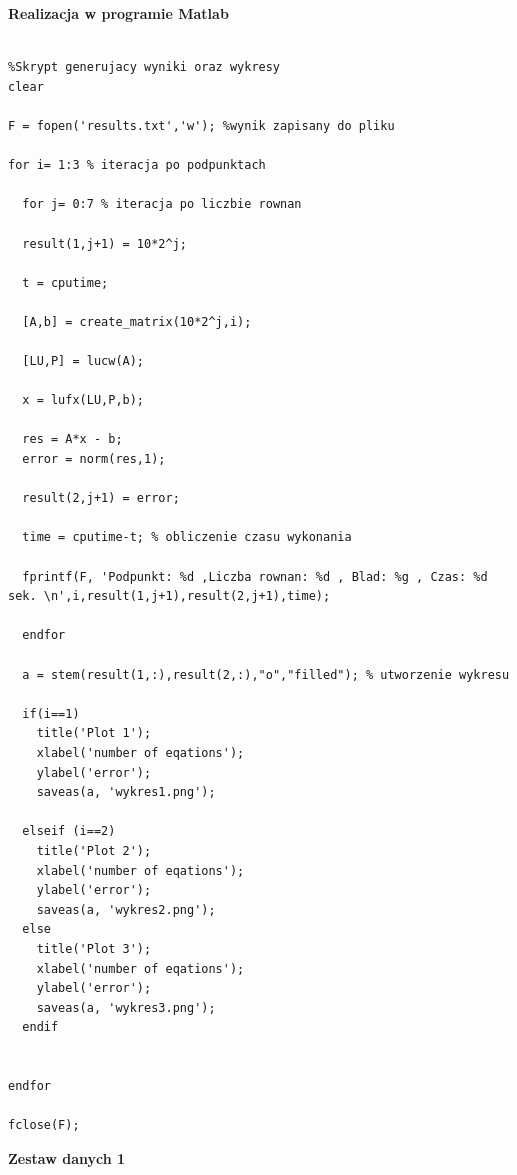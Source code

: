 \documentclass[a4paper, 11pt]{article}
\begin{document}
\textbf{Realizacja w programie Matlab}\\
\\
\begin{lstlisting}
%Skrypt generujacy wyniki oraz wykresy
clear

F = fopen('results.txt','w'); %wynik zapisany do pliku

for i= 1:3 % iteracja po podpunktach

  for j= 0:7 % iteracja po liczbie rownan
  
  result(1,j+1) = 10*2^j; 
  
  t = cputime; 

  [A,b] = create_matrix(10*2^j,i);

  [LU,P] = lucw(A);
  
  x = lufx(LU,P,b);
  
  res = A*x - b;
  error = norm(res,1); 
  
  result(2,j+1) = error; 
    
  time = cputime-t; % obliczenie czasu wykonania
  
  fprintf(F, 'Podpunkt: %d ,Liczba rownan: %d , Blad: %g , Czas: %d sek. \n',i,result(1,j+1),result(2,j+1),time);

  endfor
  
  a = stem(result(1,:),result(2,:),"o","filled"); % utworzenie wykresu
  
  if(i==1)
    title('Plot 1');
    xlabel('number of eqations');
    ylabel('error');
    saveas(a, 'wykres1.png');
  
  elseif (i==2) 
    title('Plot 2');
    xlabel('number of eqations');
    ylabel('error');
    saveas(a, 'wykres2.png');
  else
    title('Plot 3');
    xlabel('number of eqations');
    ylabel('error');
    saveas(a, 'wykres3.png');
  endif
 

endfor

fclose(F);
\end{lstlisting}


\vspace{1cm}
\textbf{Zestaw danych 1}\\
\\
\end{document}
